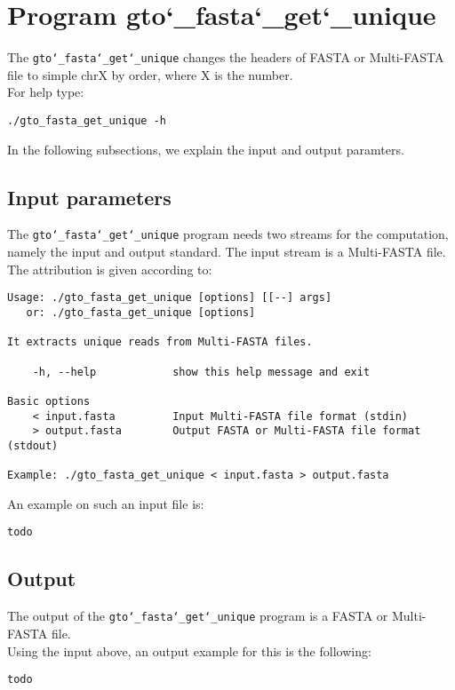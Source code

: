 \section{Program gto\char`_fasta\char`_get\char`_unique}
The \texttt{gto\char`_fasta\char`_get\char`_unique} changes the headers of FASTA or Multi-FASTA file to simple chrX by order, where X is the number.\\
For help type:
\begin{lstlisting}
./gto_fasta_get_unique -h
\end{lstlisting}
In the following subsections, we explain the input and output paramters.

\subsection*{Input parameters}

The \texttt{gto\char`_fasta\char`_get\char`_unique} program needs two streams for the computation,
namely the input and output standard. The input stream is a Multi-FASTA file.\\
The attribution is given according to:
\begin{lstlisting}
Usage: ./gto_fasta_get_unique [options] [[--] args]
   or: ./gto_fasta_get_unique [options]

It extracts unique reads from Multi-FASTA files.

    -h, --help            show this help message and exit

Basic options
    < input.fasta         Input Multi-FASTA file format (stdin)
    > output.fasta        Output FASTA or Multi-FASTA file format (stdout)

Example: ./gto_fasta_get_unique < input.fasta > output.fasta
\end{lstlisting}
An example on such an input file is:
\begin{lstlisting}
todo
\end{lstlisting}

\subsection*{Output}
The output of the \texttt{gto\char`_fasta\char`_get\char`_unique} program is a FASTA or Multi-FASTA file.\\
Using the input above, an output example for this is the following:
\begin{lstlisting}
todo
\end{lstlisting}
